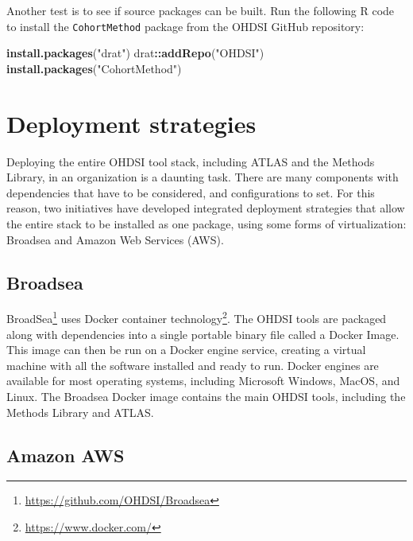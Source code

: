 \documentclass[11pt]{book}
\newenvironment{Shaded}{\begin{snugshade}}{\end{snugshade}}
\newcommand{\KeywordTok}[1]{\textcolor[rgb]{0.13,0.29,0.53}{\textbf{#1}}}
\newcommand{\NormalTok}[1]{#1}
\newcommand{\OperatorTok}[1]{\textcolor[rgb]{0.81,0.36,0.00}{\textbf{#1}}}
\newcommand{\StringTok}[1]{\textcolor[rgb]{0.31,0.60,0.02}{#1}}
\let\rmarkdownfootnote\footnote%
\def\footnote{\protect\rmarkdownfootnote}
\theoremstyle{definition}
\theoremstyle{definition}
\theoremstyle{definition}
\theoremstyle{remark}
\begin{document}
Another test is to see if source packages can be built. Run the following R code to install the \texttt{CohortMethod} package from the OHDSI GitHub repository:

\begin{Shaded}
\begin{Highlighting}[]
\KeywordTok{install.packages}\NormalTok{(}\StringTok{"drat"}\NormalTok{)}
\NormalTok{drat}\OperatorTok{::}\KeywordTok{addRepo}\NormalTok{(}\StringTok{"OHDSI"}\NormalTok{)}
\KeywordTok{install.packages}\NormalTok{(}\StringTok{"CohortMethod"}\NormalTok{)}
\end{Highlighting}
\end{Shaded}

\hypertarget{deployment-strategies}{%
\section{Deployment strategies}\label{deployment-strategies}}

Deploying the entire OHDSI tool stack, including ATLAS and the Methods Library, in an organization is a daunting task. There are many components with dependencies that have to be considered, and configurations to set. For this reason, two initiatives have developed integrated deployment strategies that allow the entire stack to be installed as one package, using some forms of virtualization: Broadsea and Amazon Web Services (AWS).

\hypertarget{broadsea}{%
\subsection{Broadsea}\label{broadsea}}

BroadSea\footnote{\url{https://github.com/OHDSI/Broadsea}} uses Docker container technology\footnote{\url{https://www.docker.com/}}. The OHDSI tools are packaged along with dependencies into a single portable binary file called a Docker Image. This image can then be run on a Docker engine service, creating a virtual machine with all the software installed and ready to run. Docker engines are available for most operating systems, including Microsoft Windows, MacOS, and Linux. The Broadsea Docker image contains the main OHDSI tools, including the Methods Library and ATLAS.

\hypertarget{amazon-aws}{%
\subsection{Amazon AWS}\label{amazon-aws}}
\end{document}
